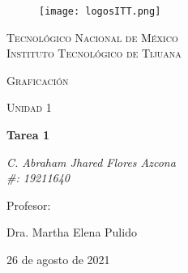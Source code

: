 \documentclass[letterpaper, 12pt]{article}
\begin{document}
    
    \begin{titlepage}
        \begin{figure}[ht]
            \centering
            \texttt{[image: logosITT.png]}
        \end{figure}
        \centering
        {\scshape\LARGE Tecnológico Nacional de México\\Instituto Tecnológico de Tijuana\par}
        \vspace{1cm}
        {\scshape\Large Graficación\par}
        \vspace{1cm}
        {\scshape\Large Unidad 1\par}
        \vspace{1.5cm}
        {\huge\bfseries Tarea 1\par}
        \vspace{2cm}
        {\Large\itshape C. Abraham Jhared Flores Azcona\\\#: 19211640\par}
        \vfill
        Profesor: \par
        Dra. Martha Elena Pulido
        
        \vfill

        {\large 26 de agosto de 2021}
    \end{titlepage}
\end{document}
